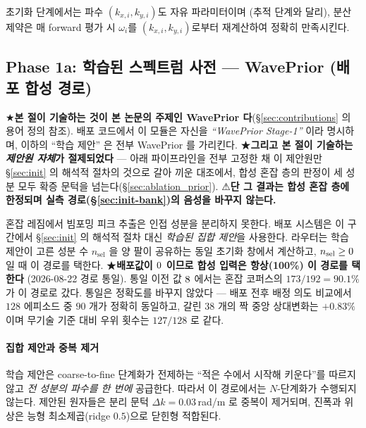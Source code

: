\documentclass[11pt]{report}
\numberwithin{equation}{chapter}
\numberwithin{figure}{chapter}
\numberwithin{table}{chapter}
\begin{document}
초기화 단계에서는 파수 $(k_{x,i}, k_{y,i})$도 자유 파라미터이며
(추적 단계와 달리), 분산 제약은 매 forward 평가 시 $\omega_i$를
$(k_{x,i}, k_{y,i})$로부터 재계산하여 정확히 만족시킨다.

\subsection{Phase 1a: 학습된 스펙트럼 사전 --- \textbf{WavePrior} (배포 합성 경로)}
\label{sec:init-learned}

★\textbf{본 절이 기술하는 것이 본 논문의 주제인 WavePrior 다}(§\ref{sec:contributions} 의
용어 정의 참조). 배포 코드에서 이 모듈은 자신을 \emph{``WavePrior Stage-1''} 이라 명시하며,
이하의 ``학습 제안'' 은 전부 WavePrior 를 가리킨다.
★\textbf{그리고 본 절이 기술하는 \emph{제안원 자체}가 절제되었다} --- 아래 파이프라인을
전부 고정한 채 이 제안원만 \S\ref{sec:init} 의 해석적 절차의 것으로 갈아 끼운 대조에서,
합성 혼잡 층의 판정이 세 성분 모두 확증 문턱을 넘는다(\S\ref{sec:ablation_prior}).
⚠\textbf{단 그 결과는 합성 혼잡 층에 한정되며 실측 경로(\S\ref{sec:init-bank})의 음성을
바꾸지 않는다.}

혼잡 레짐에서 빔포밍 피크 추출은 인접 성분을 분리하지 못한다. 배포 시스템은 이 구간에서
\S\ref{sec:init} 의 해석적 절차 대신 \emph{학습된 집합 제안}을 사용한다. 라우터는 학습
제안이 고른 성분 수 $n_\text{sel}$ 을 양 팔이 공유하는 동일 초기화 창에서 계산하고,
$n_\text{sel} \ge 0$ 일 때 이 경로를 택한다.
★\textbf{배포값이 $0$ 이므로 합성 입력은 항상(100\%) 이 경로를 택한다}
(2026-08-22 경로 통일). 통일 이전 값 $8$ 에서는 혼잡 코퍼스의
$173/192 = 90.1\%$ 가 이 경로로 갔다. 통일은 정확도를 바꾸지 않았다 --- 배포 전후
배정 의도 비교에서 $128$ 에피소드 중 $90$ 개가 정확히 동일하고, 갈린 $38$ 개의 짝
중앙 상대변화는 $+0.83\%$ 이며 무기술 기준 대비 우위 횟수는 $127/128$ 로 같다.

\paragraph{집합 제안과 중복 제거}
학습 제안은 coarse-to-fine 단계화가 전제하는 ``적은 수에서 시작해 키운다''를 따르지 않고
\emph{전 성분의 파수를 한 번에} 공급한다. 따라서 이 경로에서는 $N$-단계화가 수행되지 않는다.
제안된 원자들은 분리 문턱 $\Delta k = 0.03$\,rad/m 로 중복이 제거되며, 진폭과 위상은
능형 최소제곱(ridge $0.5$)으로 닫힌형 적합된다.
\end{document}
